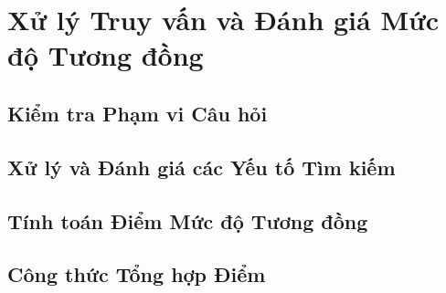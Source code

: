 \chapter{Xử lý Truy vấn và Đánh giá Mức độ Tương đồng} 
\label{chap:query_processing}

\section{Kiểm tra Phạm vi Câu hỏi}

\section{Xử lý và Đánh giá các Yếu tố Tìm kiếm}

\section{Tính toán Điểm Mức độ Tương đồng}

\section{Công thức Tổng hợp Điểm}


